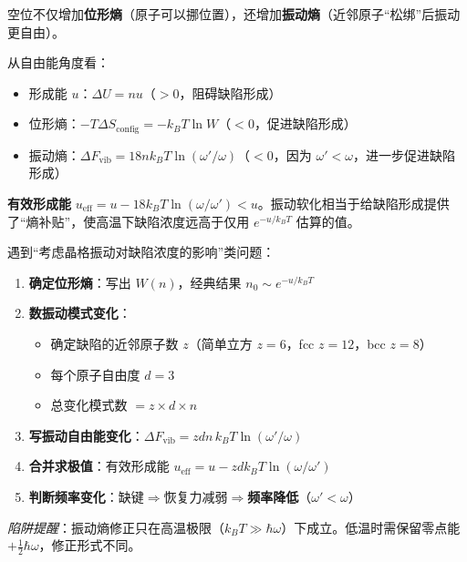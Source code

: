 \begin{insightbox}
空位不仅增加\textbf{位形熵}（原子可以挪位置），还增加\textbf{振动熵}（近邻原子``松绑''后振动更自由）。

从自由能角度看：
\begin{itemize}
    \item 形成能 $u$：$\Delta U = nu$（$>0$，阻碍缺陷形成）
    \item 位形熵：$-T\Delta S_{\mathrm{config}} = -k_{\!B}T\ln W$（$<0$，促进缺陷形成）
    \item 振动熵：$\Delta F_{\mathrm{vib}} = 18nk_{\!B}T\ln(\omega'/\omega)$（$<0$，因为 $\omega'<\omega$，进一步促进缺陷形成）
\end{itemize}
\textbf{有效形成能} $u_{\mathrm{eff}} = u - 18k_{\!B}T\ln(\omega/\omega') < u$。振动软化相当于给缺陷形成提供了``熵补贴''，使高温下缺陷浓度远高于仅用 $e^{-u/k_{\!B}T}$ 估算的值。
\end{insightbox}

\begin{thinkbox}
遇到``考虑晶格振动对缺陷浓度的影响''类问题：
\begin{enumerate}
    \item \textbf{确定位形熵}：写出 $W(n)$，经典结果 $n_0\sim e^{-u/k_{\!B}T}$
    \item \textbf{数振动模式变化}：
    \begin{itemize}
        \item 确定缺陷的近邻原子数 $z$（简单立方 $z=6$，fcc $z=12$，bcc $z=8$）
        \item 每个原子自由度 $d=3$
        \item 总变化模式数 $=z\times d\times n$
    \end{itemize}
    \item \textbf{写振动自由能变化}：$\Delta F_{\mathrm{vib}} = zdn\,k_{\!B}T\ln(\omega'/\omega)$
    \item \textbf{合并求极值}：有效形成能 $u_{\mathrm{eff}} = u - zdk_{\!B}T\ln(\omega/\omega')$
    \item \textbf{判断频率变化}：缺键$\Rightarrow$恢复力减弱$\Rightarrow$\textbf{频率降低}（$\omega'<\omega$）
\end{enumerate}
\textit{陷阱提醒}：振动熵修正只在高温极限（$k_{\!B}T\gg\hbar\omega$）下成立。低温时需保留零点能 $+\frac{1}{2}\hbar\omega$，修正形式不同。
\end{thinkbox}
